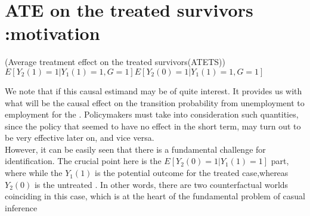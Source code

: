 \documentclass{article}
\begin{document}
\section{ATE on the treated survivors :motivation}

\begin{definition}
    (Average treatment effect on the treated survivors(ATETS))\\
    $  E[Y_2(1) =1| Y_1(1)=1, G=1 ]  E[ Y_2(0) = 1 | Y_1(1) =1, G=1] $
\end{definition}

We note that if this causal estimand may be of quite interest. It provides us with what will be the causal effect on the transition probability from unemployment to employment for the . Policymakers must take into consideration such quantities, since the policy that seemed to have no effect in the short term, may turn out to be very effective later on, and vice versa. \\
However, it can be easily seen that there is a fundamental challenge for identification.
The crucial point here is the $ E [ Y_2(0) = 1 | Y_1(1) = 1] $ part, where while the $Y_1(1) $ 
is the potential outcome for the treated case,whereas $ Y_2(0) $ is the untreated . In other words, there are two counterfactual worlds coinciding in this case, which is at the heart of the fundamental problem of casual inference \cite{imbens2015causal} \\
\end{document}
